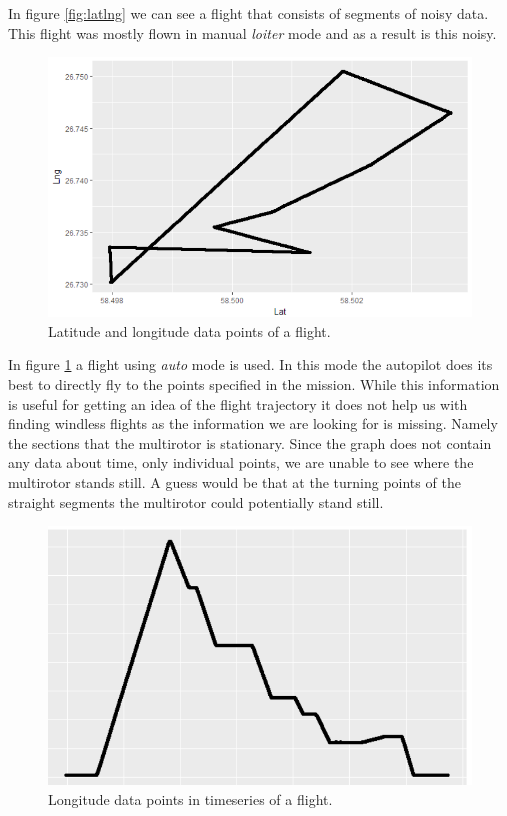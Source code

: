 \documentclass[12pt,oneside]{reedthesis}
\theoremstyle{definition}
\theoremstyle{definition}
\theoremstyle{definition}
\theoremstyle{remark}
\begin{document}
In figure \ref{fig:latlng} we can see a flight that consists of segments
of noisy data. This flight was mostly flown in manual \emph{loiter} mode
and as a result is this noisy.
\begin{figure}
\centering
\includegraphics{./figure/latlng3.PNG}
\caption{\label{fig:latlngclean}Latitude and longitude data points of a
flight.}
\end{figure}
In figure \ref{fig:latlngclean} a flight using \emph{auto} mode is used.
In this mode the autopilot does its best to directly fly to the points
specified in the mission. While this information is useful for getting
an idea of the flight trajectory it does not help us with finding
windless flights as the information we are looking for is missing.
Namely the sections that the multirotor is stationary. Since the graph
does not contain any data about time, only individual points, we are
unable to see where the multirotor stands still. A guess would be that
at the turning points of the straight segments the multirotor could
potentially stand still.
\begin{figure}
\centering
\includegraphics{./figure/lng.PNG}
\caption{\label{fig:lng}Longitude data points in timeseries of a flight.}
\end{figure}
\end{document}

